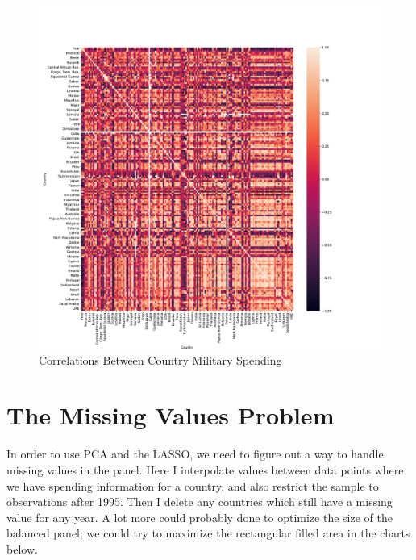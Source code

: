 \documentclass{report}
\begin{document}
	\begin{figure}[h!]
		\centering
		\caption{Correlations Between Country Military Spending}
		\label{Milex_Correlations}	
		\includegraphics[width=\linewidth,keepaspectratio=true]{../Output/Figures/Milex_Correlations.pdf}
	\end{figure}

    \section*{The Missing Values Problem}

    In order to use PCA and the LASSO, we need to figure out a way to handle missing values in the panel. Here I interpolate values between data points where we have spending information for a country, and also restrict the sample to observations after 1995. Then I delete any countries which still have a missing value for any year. A lot more could probably done to optimize the size of the balanced panel; we could try to maximize the rectangular filled area in the charts below.
\end{document}
